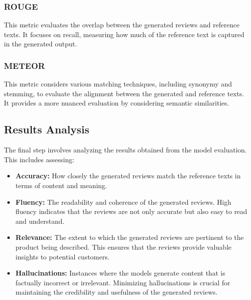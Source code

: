 \subsubsection{ROUGE}
This metric evaluates the overlap between the generated reviews and reference texts. It focuses on recall, measuring how much of the reference text is captured in the generated output.

\subsubsection{METEOR}
This metric considers various matching techniques, including synonymy and stemming, to evaluate the alignment between the generated and reference texts. It provides a more nuanced evaluation by considering semantic similarities.

\subsection{Results Analysis}
The final step involves analyzing the results obtained from the model evaluation. This includes assessing:

\begin{itemize}
    \item \textbf{Accuracy:} How closely the generated reviews match the reference texts in terms of content and meaning.
    \item \textbf{Fluency:} The readability and coherence of the generated reviews. High fluency indicates that the reviews are not only accurate but also easy to read and understand.
    \item \textbf{Relevance:} The extent to which the generated reviews are pertinent to the product being described. This ensures that the reviews provide valuable insights to potential customers.
    \item \textbf{Hallucinations:} Instances where the models generate content that is factually incorrect or irrelevant. Minimizing hallucinations is crucial for maintaining the credibility and usefulness of the generated reviews.
\end{itemize}